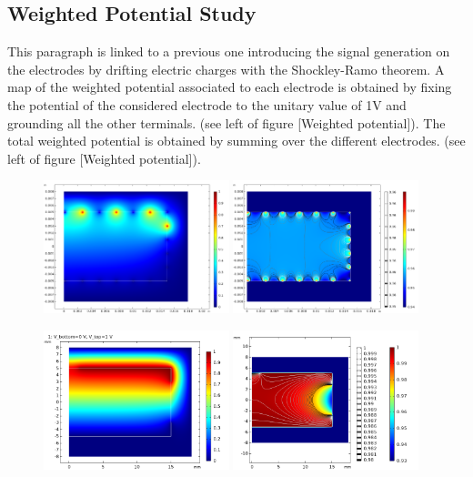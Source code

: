 \subsection{Weighted Potential Study}
\label{par:weighting-potential}

This paragraph is linked to a previous one introducing the signal generation on the electrodes by drifting electric charges with the Shockley-Ramo theorem. A map of the weighted potential associated to each electrode is obtained by fixing the potential of the considered electrode to the unitary value of 1V and grounding all the other terminals. (see left of  figure [Weighted potential]). The total weighted potential is obtained by summing over the different electrodes. (see left of  figure [Weighted potential]).

\begin{figure}
\centering
\includegraphics[width=0.48\textwidth]{Figures/Electrodes/weighted_potential_collect.png}
\includegraphics[width=0.48\textwidth]{Figures/Electrodes/weighted_potential_total.png}

\includegraphics[width=0.48\textwidth]{Figures/Electrodes/weighted_potential_top.png}
\includegraphics[width=0.48\textwidth]{Figures/Electrodes/weighted_potential_total_planar38.png}



\end{figure}
